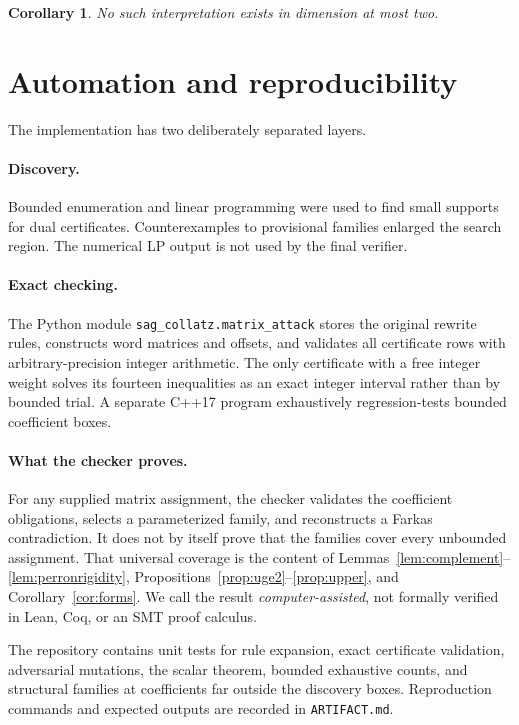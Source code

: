\documentclass[11pt]{article}
\newtheorem{corollary}[theorem]{Corollary}
\theoremstyle{definition}
\begin{document}
\begin{corollary}
No such interpretation exists in dimension at most two.
\end{corollary}

\section{Automation and reproducibility}

The implementation has two deliberately separated layers.

\paragraph{Discovery.}
Bounded enumeration and linear programming were used to find small supports
for dual certificates.  Counterexamples to provisional families enlarged
the search region.  The numerical LP output is not used by the final
verifier.

\paragraph{Exact checking.}
The Python module \texttt{sag\_collatz.matrix\_attack} stores the original
rewrite rules, constructs word matrices and offsets, and validates all
certificate rows with arbitrary-precision integer arithmetic.  The only
certificate with a free integer weight solves its fourteen inequalities as
an exact integer interval rather than by bounded trial.  A separate C++17
program exhaustively regression-tests bounded coefficient boxes.

\paragraph{What the checker proves.}
For any supplied matrix assignment, the checker validates the coefficient
obligations, selects a parameterized family, and reconstructs a Farkas
contradiction.  It does not by itself prove that the families cover every
unbounded assignment.  That universal coverage is the content of
Lemmas~\ref{lem:complement}--\ref{lem:perronrigidity},
Propositions~\ref{prop:uge2}--\ref{prop:upper}, and
Corollary~\ref{cor:forms}.  We call the result \emph{computer-assisted}, not
formally verified in Lean, Coq, or an SMT proof calculus.

The repository contains unit tests for rule expansion, exact certificate
validation, adversarial mutations, the scalar theorem, bounded exhaustive
counts, and structural families at coefficients far outside the discovery
boxes.  Reproduction commands and expected outputs are recorded in
\texttt{ARTIFACT.md}.
\end{document}
